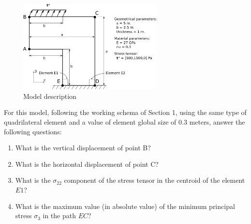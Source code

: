 \begin{figure}[!h]
  \begin{center}
    \includegraphics[width=0.65\textwidth]{./body/images/imagen115}
  \end{center}
  \caption{Model description}
  \label{figu115}
\end{figure}

For this model, following the working schema of Section 1, using the
same type of quadrilateral element and a value of element global size
of $0.3$ meters, answer the following questions:



\begin{enumerate}
\item What is the vertical displacement of point B?
  \begin{multicols}{4}
\columnbreak
{}
\columnbreak
{}
\columnbreak
{}
  \end{multicols}
\item What is the horizontal displacement of point C?
  \begin{multicols}{4}
\columnbreak
{}
\columnbreak
{}
\columnbreak
{}
  \end{multicols}
\item What is the $\sigma_{22}$ component of the stress tensor in the centroid of the element $E1$?
  \begin{multicols}{4}
\columnbreak
{}
\columnbreak
{}
\columnbreak
{}
  \end{multicols}
\item What is the maximum value (in absolute value) of the minimum principal stress $\sigma_3$ in the path $EC$?
  \begin{multicols}{4}
\columnbreak
{}
\columnbreak
{}
\columnbreak
{}
  \end{multicols}
\end{enumerate}
